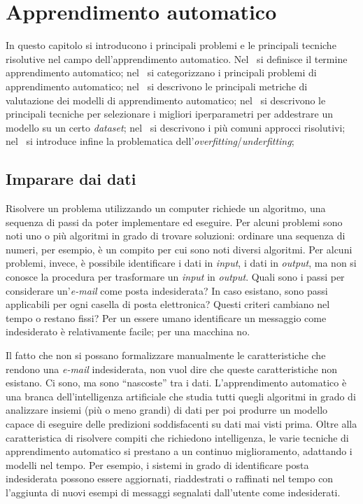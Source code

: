 \chapter{Apprendimento automatico}\label{chap:AI_ML}
In questo capitolo si introducono i principali problemi e le principali tecniche risolutive nel campo dell'apprendimento automatico.
Nel~ si definisce il termine apprendimento automatico; nel~ si categorizzano i principali problemi di apprendimento automatico; nel~ si descrivono le principali metriche di valutazione dei modelli di apprendimento automatico; nel~ si descrivono le principali tecniche per selezionare i migliori iperparametri per addestrare un modello su un certo \emph{dataset}; nel~ si descrivono i più comuni approcci risolutivi; nel~ si introduce infine la problematica dell'\emph{overfitting}/\emph{underfitting}; 

\section{Imparare dai dati}\label{sec:imparare_dai_dati}
Risolvere un problema utilizzando un computer richiede un algoritmo, una sequenza di passi da poter implementare ed eseguire. 
Per alcuni problemi sono noti uno o più algoritmi in grado di trovare soluzioni: ordinare una sequenza di numeri, per esempio, è un compito per cui sono noti diversi algoritmi. 
Per alcuni problemi, invece, è possibile identificare i dati in \emph{input}, i dati in \emph{output}, ma non si conosce la procedura per trasformare un \emph{input} in \emph{output}. 
Quali sono i passi per considerare un'\textit{e-mail} come posta indesiderata? 
In caso esistano, sono passi applicabili per ogni casella di posta elettronica? 
Questi criteri cambiano nel tempo o restano fissi? 
Per un essere umano identificare un messaggio come indesiderato è relativamente facile; per una macchina no.

Il fatto che non si possano formalizzare manualmente le caratteristiche che rendono una \emph{e-mail} indesiderata, non vuol dire che queste caratteristiche non esistano. 
Ci sono, ma sono ``nascoste'' tra i dati.
L'apprendimento automatico è una branca dell'intelligenza artificiale che studia tutti quegli algoritmi in grado di analizzare insiemi (più o meno grandi) di dati per poi produrre un modello capace di eseguire delle predizioni soddisfacenti su dati mai visti prima. 
Oltre alla caratteristica di risolvere compiti che richiedono intelligenza, le varie tecniche di apprendimento automatico si prestano a un continuo miglioramento, adattando i modelli nel tempo.
Per esempio, i sistemi in grado di identificare posta indesiderata possono essere aggiornati, riaddestrati o raffinati nel tempo con l'aggiunta di nuovi esempi di messaggi segnalati dall'utente come indesiderati.

